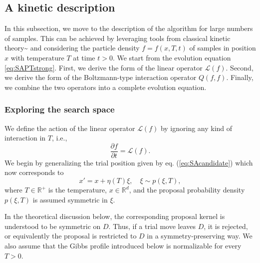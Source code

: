 \documentclass[10pt,a4paper]{article}
\theoremstyle{theorem}
\numberwithin{equation}{section}
\begin{document}
\subsection{A kinetic description}
\label{sec:population}

In this subsection, we move to the description of the algorithm for large numbers of samples. This can be achieved by leveraging tools from classical kinetic theory^^>\cite{pareschi_interacting_2014} and considering the particle density $f=f(x,T,t)$ of samples in position $x$ with temperature $T$ at time $t>0$. We start from the evolution equation \eqref{eq:SAPTstrong}. First, we derive the form of the linear operator $\mathcal{L}(f)$. Second, we derive the form of the Boltzmann-type interaction operator $Q(f,f)$. Finally, we combine the two operators into a complete evolution equation. 

\subsubsection{Exploring the search space}
\label{subsec:population_Lf}

We define the action of the linear operator $\mathcal{L}(f)$ by ignoring any kind of interaction in $T$, i.e.,
\begin{equation}
\label{eq:Lf}
\frac{\partial f}{\partial t}=\mathcal{L}(f).
\end{equation}
We begin by generalizing the trial position given by eq. (\ref{eq:SAcandidate}) which now corresponds to 
\begin{equation}
\label{eq:SAexploration}
x'=x+\eta(T)\xi, \quad \xi\sim p(\xi, T),
\end{equation}
where $T\in\mathbb{R}^+$ is the temperature, $x\in\mathbb{R}^d$, and the proposal probability density $p(\xi, T)$ is assumed symmetric in $\xi$.

In the theoretical discussion below, the corresponding proposal kernel is understood to be symmetric on \(D\). Thus, if a trial move leaves \(D\), it is rejected, or equivalently the proposal is restricted to \(D\) in a symmetry-preserving way. We also assume that the Gibbs profile introduced below is normalizable for every \(T>0\).
 
\end{document}
